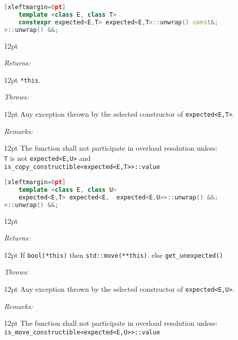 \documentclass[a4paper,10pt]{article}
\newcommand{\cpp}[1]{\lstinline{#1}}
\newcommand{\wordingItem}[1]{\noindent\textit{#1:}}
\newenvironment{wordingTextItem}[1]{\wordingItem{#1}\vspace{2pt}\noindent\begin{adjustwidth}{12pt}{}}{\vspace{2pt}\end{adjustwidth}}
\newenvironment{wordingPara}{\begin{adjustwidth}{12pt}{}}{\end{adjustwidth}}
\begin{document}
\begin{lstlisting}[language=C++][xleftmargin=0pt]
    template <class E, class T>
    constexpr expected<E,T> expected<E,T>::unwrap() const&;
>::unwrap() &&;
\end{lstlisting}

\begin{wordingPara}

\begin{wordingTextItem}{Returns}
\cpp{*this}.
\end{wordingTextItem}

\begin{wordingTextItem}{Throws}
Any exception thrown by the selected constructor of \cpp{expected<E,T>}.
\end{wordingTextItem}

\begin{wordingTextItem}{Remarks}
The function shall not participate in overload resolution unless: \\
\cpp{T} is not  \cpp{expected<E,U>}  and \\
\cpp{is_copy_constructible<expected<E,T>>::value} \\
\end{wordingTextItem}

\end{wordingPara}

\begin{lstlisting}[language=C++][xleftmargin=0pt]
    template <class E, class U>
    expected<E,T> expected<E,  expected<E,U>>::unwrap() &&;
>::unwrap() &&;
\end{lstlisting}

\begin{wordingPara}

\begin{wordingTextItem}{Returns}
If \cpp{bool(*this)} then \cpp{std::move(**this)}.
else \cpp{get_unexpected()}
\end{wordingTextItem}

\begin{wordingTextItem}{Throws}
Any exception thrown by the selected constructor of \cpp{expected<E,U>}.
\end{wordingTextItem}

\begin{wordingTextItem}{Remarks}
The function shall not participate in overload resolution unless: \\
\cpp{is_move_constructible<expected<E,U>>::value} \\
\end{wordingTextItem}

\end{wordingPara}
\end{document}
